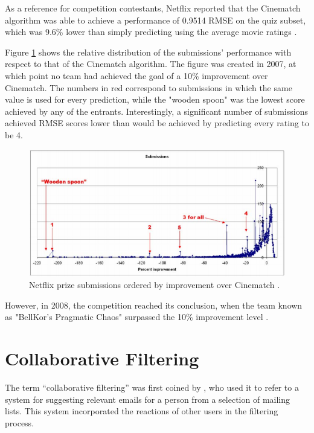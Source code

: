 As a reference for competition contestants, Netflix reported that the Cinematch algorithm was able to achieve a performance of 0.9514 RMSE on the quiz subset, which was 9.6\% lower than simply predicting using the average movie ratings \parencite{netflix_description}.

Figure \ref{fig:netflix_submissions} shows the relative distribution of the submissions' performance with respect to that of the Cinematch algorithm. The figure was created in 2007, at which point no team had achieved the goal of a 10\% improvement over Cinematch. The numbers in red correspond to submissions in which the same value is used for every prediction, while the "wooden spoon" was the lowest score achieved by any of the entrants. Interestingly, a significant number of submissions achieved RMSE scores lower than would be achieved by predicting every rating to be 4.

\begin{figure}[H]
\centering
\includegraphics[width=13cm]{Figures/2_1_netflix-prize.png}
\decoRule
\caption[Netflix submissions]{Netflix prize submissions ordered by improvement over Cinematch \parencite{netflix_description}.}
\label{fig:netflix_submissions}
\end{figure}

However, in 2008, the competition reached its conclusion, when the team known as "BellKor's Pragmatic Chaos" surpassed the 10\% improvement level \parencite{netflix_bellkor}.

\section{Collaborative Filtering}
The term ``collaborative filtering'' was first coined by \cite{cf_1.3_origin}, who used it to refer to a system for suggesting relevant emails for a person from a selection of mailing lists. This system incorporated the reactions of other users in the filtering process.

